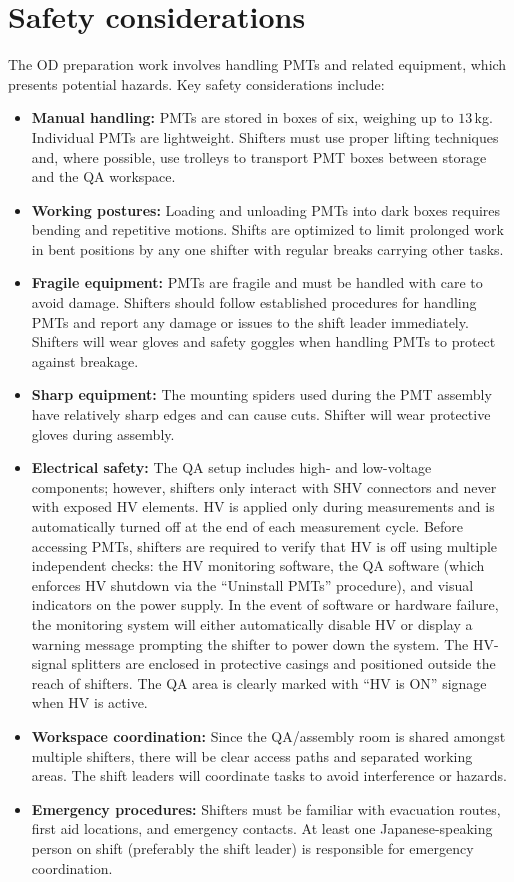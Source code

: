 \documentclass[12pt,a4paper]{article}
\begin{document}

\section{Safety considerations} \label{sec:safety}
The OD preparation work involves handling PMTs and related equipment, which presents potential hazards. Key safety considerations include:
\begin{itemize}
    \item \textbf{Manual handling:} PMTs are stored in boxes of six, weighing up to $13$\,kg. Individual PMTs are lightweight. Shifters must use proper lifting techniques and, where possible, use trolleys to transport PMT boxes between storage and the QA workspace.
    \item \textbf{Working postures:} Loading and unloading PMTs into dark boxes requires bending and repetitive motions. Shifts are optimized to limit prolonged work in bent positions by any one shifter with regular breaks carrying other tasks.
    \item \textbf{Fragile equipment:} PMTs are fragile and must be handled with care to avoid damage. Shifters should follow established procedures for handling PMTs and report any damage or issues to the shift leader immediately. Shifters will wear gloves and safety goggles when handling PMTs to protect against breakage.
    \item \textbf{Sharp equipment:} The mounting spiders used during the PMT assembly have relatively sharp edges and can cause cuts. Shifter will wear protective gloves during assembly.
    \item \textbf{Electrical safety:} The QA setup includes high- and low-voltage components; however, shifters only interact with SHV connectors and never with exposed HV elements. HV is applied only during measurements and is automatically turned off at the end of each measurement cycle. Before accessing PMTs, shifters are required to verify that HV is off using multiple independent checks: the HV monitoring software, the QA software (which enforces HV shutdown via the “Uninstall PMTs” procedure), and visual indicators on the power supply. In the event of software or hardware failure, the monitoring system will either automatically disable HV or display a warning message prompting the shifter to power down the system. The HV-signal splitters are enclosed in protective casings and positioned outside the reach of shifters. The QA area is clearly marked with “HV is ON” signage when HV is active.
    \item \textbf{Workspace coordination:} Since the QA/assembly room is shared amongst multiple shifters, there will be clear access paths and separated working areas. The shift leaders will coordinate tasks to avoid interference or hazards.
    \item \textbf{Emergency procedures:} Shifters must be familiar with evacuation routes, first aid locations, and emergency contacts. At least one Japanese-speaking person on shift (preferably the shift leader) is responsible for emergency coordination.
\end{itemize}
\end{document}
